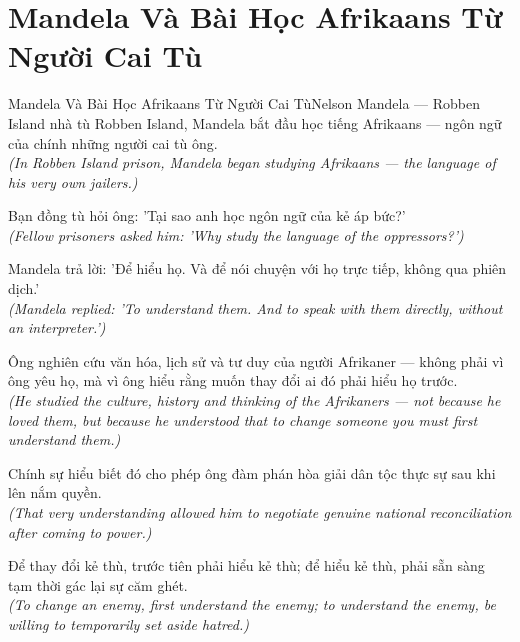 \section{Mandela Và Bài Học Afrikaans Từ Người Cai Tù}
\begin{truyen}{Mandela Và Bài Học Afrikaans Từ Người Cai Tù}{Nelson Mandela --- Robben Island}
 nhà tù Robben Island, Mandela bắt đầu học tiếng Afrikaans --- ngôn ngữ của chính những người cai tù ông.\\[4pt]
\textit{(In Robben Island prison, Mandela began studying Afrikaans --- the language of his very own jailers.)}

Bạn đồng tù hỏi ông: 'Tại sao anh học ngôn ngữ của kẻ áp bức?'\\[4pt]
\textit{(Fellow prisoners asked him: 'Why study the language of the oppressors?')}

Mandela trả lời: 'Để hiểu họ. Và để nói chuyện với họ trực tiếp, không qua phiên dịch.'\\[4pt]
\textit{(Mandela replied: 'To understand them. And to speak with them directly, without an interpreter.')}

Ông nghiên cứu văn hóa, lịch sử và tư duy của người Afrikaner --- không phải vì ông yêu họ, mà vì ông hiểu rằng muốn thay đổi ai đó phải hiểu họ trước.\\[4pt]
\textit{(He studied the culture, history and thinking of the Afrikaners --- not because he loved them, but because he understood that to change someone you must first understand them.)}

Chính sự hiểu biết đó cho phép ông đàm phán hòa giải dân tộc thực sự sau khi lên nắm quyền.\\[4pt]
\textit{(That very understanding allowed him to negotiate genuine national reconciliation after coming to power.)}

\end{truyen}
\begin{baihoc}
  Để thay đổi kẻ thù, trước tiên phải hiểu kẻ thù; để hiểu kẻ thù, phải sẵn sàng tạm thời gác lại sự căm ghét.\\[4pt]
  \textit{(To change an enemy, first understand the enemy; to understand the enemy, be willing to temporarily set aside hatred.)}
\end{baihoc}

